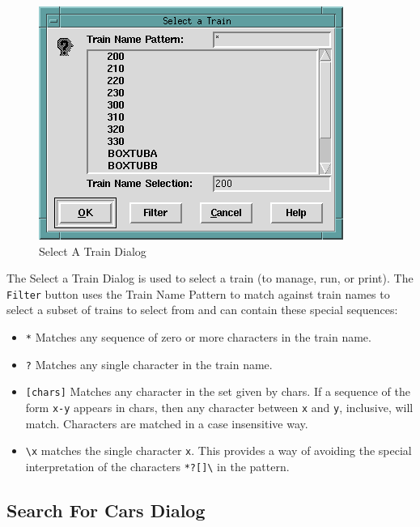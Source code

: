 \begin{figure}[hbpt]
\begin{centering}
\includegraphics{FCFSelectATrainDialog.png}
\caption{Select A Train Dialog}
\label{fig:fcf:selecttraindialog}
\end{centering}
\end{figure}
The Select a Train Dialog is used to select a train (to manage, run, or
print). The \verb=Filter= button uses the Train Name Pattern to match
against train names to select a subset of trains to select from and can
contain these special sequences:  
\begin{itemize} 
\item \verb=*= Matches any sequence of zero or more characters in the
train name.
\item \verb=?= Matches any single character in the train name. 
\item \verb=[chars]= Matches any character in the set given by chars. 
If a sequence of the form \verb=x-y= appears in chars, then any
character between \verb=x= and  \verb=y=,  inclusive,  will match.
Characters are matched in a case insensitive way. 
\item \verb=\x= matches the single character \verb=x=. This provides a 
way of avoiding the special interpretation of the characters
\verb=*?[]\= in the pattern.
\end{itemize}

\subsection{Search For Cars Dialog}
\label{sect:fcf:searchcarsdialog}

